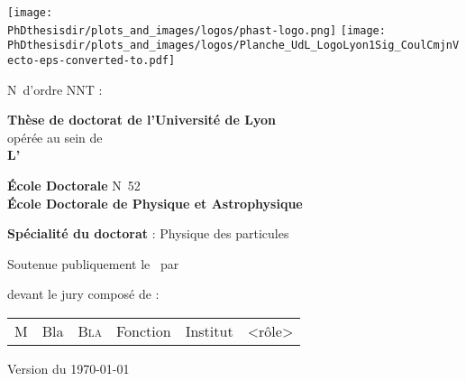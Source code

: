 \thispagestyle{empty}
\begin{center}
\large

\texttt{[image: \\PhDthesisdir/plots\_and\_images/logos/phast-logo.png]}
\hfill
\texttt{[image: \\PhDthesisdir/plots\_and\_images/logos/Planche\_UdL\_LogoLyon1Sig\_CoulCmjnVecto-eps-converted-to.pdf]}

\vspace{5mm}
\begin{flushleft}
N\degree\ d'ordre NNT : 
\end{flushleft}

\vspace{5mm}

{\LARGE \textbf{Thèse de doctorat de l'Université de Lyon}}\\
opérée au sein de\\
\textbf{L'\insertinstitute}

\vspace{1cm}

\textbf{École Doctorale} N\degree\ 52\\
\textbf{École Doctorale de Physique et Astrophysique}

\vspace{1cm}

\textbf{Spécialité du doctorat} : Physique des particules

\vspace{1.5cm}

Soutenue publiquement le \insertdate\ par

\vspace{1cm}

{\LARGE \textbf{\insertauthor}}

\vspace{1.5cm}

\textbf{\huge\inserttitle}

\vfill
devant le jury composé de :
\vspace{5mm}

\begin{tabular}{llllcc}
M & Bla & \textsc{Bla} & Fonction & Institut & <rôle>
\end{tabular}

\vspace{1cm}
{\scriptsize Version du \today}
\end{center}